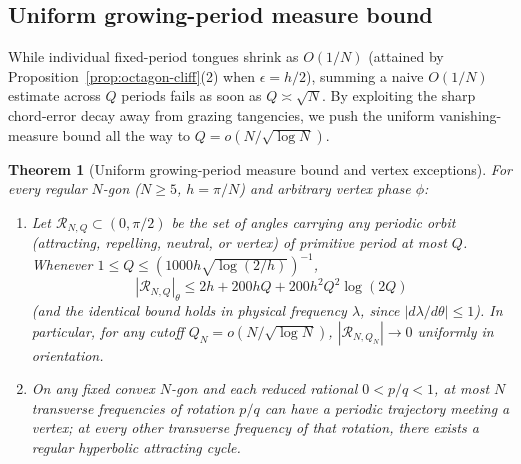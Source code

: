 \documentclass[11pt,reqno]{amsart}
\newtheorem{theorem}{Theorem}[section]
\theoremstyle{definition}
\theoremstyle{remark}
\begin{document}
\subsection{Uniform growing-period measure bound}
While individual fixed-period tongues shrink as $O(1/N)$ (attained by Proposition~\ref{prop:octagon-cliff}(2) when $\epsilon = h/2$), summing a naive $O(1/N)$ estimate across $Q$ periods fails as soon as $Q \asymp \sqrt{N}$. By exploiting the sharp chord-error decay away from grazing tangencies, we push the uniform vanishing-measure bound all the way to $Q = o(N/\sqrt{\log N})$.

\begin{theorem}[Uniform growing-period measure bound and vertex exceptions]\label{thm:growing-Q}
For every regular $N$-gon ($N \ge 5$, $h = \pi/N$) and arbitrary vertex phase $\phi$:
\begin{enumerate}
  \item Let $\mathcal{R}_{N,Q} \subset (0,\pi/2)$ be the set of angles carrying \emph{any} periodic orbit (attracting, repelling, neutral, or vertex) of primitive period at most $Q$. Whenever $1 \le Q \le (1000 h \sqrt{\log(2/h)})^{-1}$,
  \begin{equation}\label{eq:growing-Q}
    |\mathcal{R}_{N,Q}|_\theta \le 2h + 200 h Q + 200 h^2 Q^2 \log(2Q)
  \end{equation}
  (and the identical bound holds in physical frequency $\lambda$, since $|d\lambda/d\theta| \le 1$). In particular, for any cutoff $Q_N = o(N/\sqrt{\log N})$, $|\mathcal{R}_{N, Q_N}| \to 0$ uniformly in orientation.
  \item On \emph{any} fixed convex $N$-gon and each reduced rational $0 < p/q < 1$, at most $N$ transverse frequencies of rotation $p/q$ can have a periodic trajectory meeting a vertex; at every other transverse frequency of that rotation, there exists a regular hyperbolic attracting cycle.
\end{enumerate}
\end{theorem}
\end{document}
